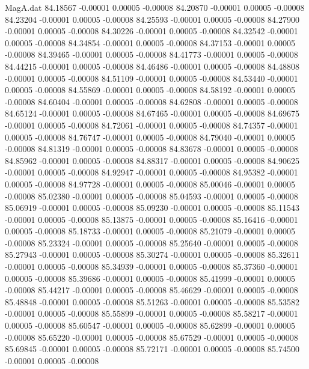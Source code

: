\begin{filecontents}{MagA.dat}
  84.18567   -0.00001    0.00005   -0.00008
  84.20870   -0.00001    0.00005   -0.00008
  84.23204   -0.00001    0.00005   -0.00008
  84.25593   -0.00001    0.00005   -0.00008
  84.27900   -0.00001    0.00005   -0.00008
  84.30226   -0.00001    0.00005   -0.00008
  84.32542   -0.00001    0.00005   -0.00008
  84.34854   -0.00001    0.00005   -0.00008
  84.37153   -0.00001    0.00005   -0.00008
  84.39465   -0.00001    0.00005   -0.00008
  84.41773   -0.00001    0.00005   -0.00008
  84.44215   -0.00001    0.00005   -0.00008
  84.46486   -0.00001    0.00005   -0.00008
  84.48808   -0.00001    0.00005   -0.00008
  84.51109   -0.00001    0.00005   -0.00008
  84.53440   -0.00001    0.00005   -0.00008
  84.55869   -0.00001    0.00005   -0.00008
  84.58192   -0.00001    0.00005   -0.00008
  84.60404   -0.00001    0.00005   -0.00008
  84.62808   -0.00001    0.00005   -0.00008
  84.65124   -0.00001    0.00005   -0.00008
  84.67465   -0.00001    0.00005   -0.00008
  84.69675   -0.00001    0.00005   -0.00008
  84.72061   -0.00001    0.00005   -0.00008
  84.74357   -0.00001    0.00005   -0.00008
  84.76747   -0.00001    0.00005   -0.00008
  84.79040   -0.00001    0.00005   -0.00008
  84.81319   -0.00001    0.00005   -0.00008
  84.83678   -0.00001    0.00005   -0.00008
  84.85962   -0.00001    0.00005   -0.00008
  84.88317   -0.00001    0.00005   -0.00008
  84.90625   -0.00001    0.00005   -0.00008
  84.92947   -0.00001    0.00005   -0.00008
  84.95382   -0.00001    0.00005   -0.00008
  84.97728   -0.00001    0.00005   -0.00008
  85.00046   -0.00001    0.00005   -0.00008
  85.02380   -0.00001    0.00005   -0.00008
  85.04593   -0.00001    0.00005   -0.00008
  85.06919   -0.00001    0.00005   -0.00008
  85.09230   -0.00001    0.00005   -0.00008
  85.11543   -0.00001    0.00005   -0.00008
  85.13875   -0.00001    0.00005   -0.00008
  85.16416   -0.00001    0.00005   -0.00008
  85.18733   -0.00001    0.00005   -0.00008
  85.21079   -0.00001    0.00005   -0.00008
  85.23324   -0.00001    0.00005   -0.00008
  85.25640   -0.00001    0.00005   -0.00008
  85.27943   -0.00001    0.00005   -0.00008
  85.30274   -0.00001    0.00005   -0.00008
  85.32611   -0.00001    0.00005   -0.00008
  85.34939   -0.00001    0.00005   -0.00008
  85.37360   -0.00001    0.00005   -0.00008
  85.39686   -0.00001    0.00005   -0.00008
  85.41999   -0.00001    0.00005   -0.00008
  85.44217   -0.00001    0.00005   -0.00008
  85.46629   -0.00001    0.00005   -0.00008
  85.48848   -0.00001    0.00005   -0.00008
  85.51263   -0.00001    0.00005   -0.00008
  85.53582   -0.00001    0.00005   -0.00008
  85.55899   -0.00001    0.00005   -0.00008
  85.58217   -0.00001    0.00005   -0.00008
  85.60547   -0.00001    0.00005   -0.00008
  85.62899   -0.00001    0.00005   -0.00008
  85.65220   -0.00001    0.00005   -0.00008
  85.67529   -0.00001    0.00005   -0.00008
  85.69845   -0.00001    0.00005   -0.00008
  85.72171   -0.00001    0.00005   -0.00008
  85.74500   -0.00001    0.00005   -0.00008
\end{filecontents}
